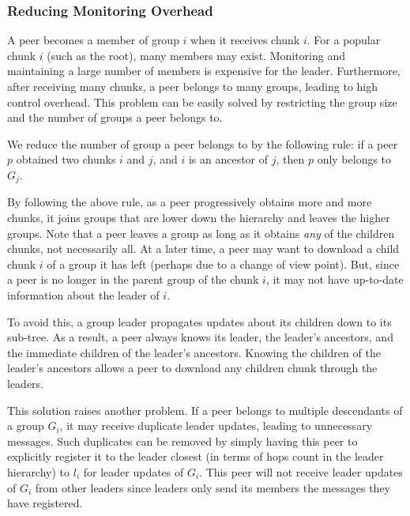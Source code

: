 \subsubsection{Reducing Monitoring Overhead}

    A peer becomes a member of group $i$ when it receives
    chunk $i$.  For a popular chunk $i$ (such as the root), 
    many members may exist.  Monitoring and maintaining 
    a large number of members is expensive for the leader.
    Furthermore, after receiving many chunks, a peer belongs
    to many groups, leading to high control overhead.
    This problem can be easily solved by restricting the 
    group size and the number of groups a peer belongs to.  

    We reduce the number of group a peer belongs to by the 
    following rule: if a peer $p$ obtained two chunks $i$
    and $j$, and $i$ is an ancestor of $j$, then $p$ only
    belongs to $G_j$.  

    By following the above rule, as a peer progressively 
    obtains more and more chunks, it joins groups that are
    lower down the hierarchy and leaves the higher groups.
    Note that a peer leaves a group as long as it obtains
    \textit{any} of the children chunks, not necessarily
    all.  At a later time, a peer may want to download a 
    child chunk $i$ of a group it has left (perhaps due to 
    a change of view point).  But, since a peer is no 
    longer in the parent group of the chunk $i$, it may not
    have up-to-date information about the leader of $i$.

    To avoid this, a group leader propagates updates %
    about its children down to its sub-tree.  As a result,
    a peer always knows its leader, the leader's ancestors,
    and the immediate children of the leader's ancestors.
    Knowing the children of the leader's ancestors allows
    a peer to download any children chunk through the leaders.

    This solution raises another problem.  If a peer belongs
    to multiple descendants of a group $G_i$, it may receive
    duplicate leader updates, %
    leading to unnecessary messages.  
    Such duplicates can be removed by simply having
    this peer to explicitly register it to the leader closest
    (in terms of hops count in the
    leader hierarchy) to $l_i$ for leader updates of $G_i$.
    This peer will not receive leader updates of $G_i$ from other
    leaders since leaders only send its members the messages they have
    registered. %

